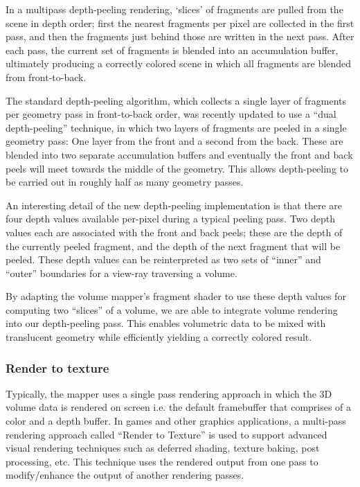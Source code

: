 In a multipass depth-peeling rendering, `slices' of fragments are
pulled from the scene in depth order; first the nearest fragments per
pixel are collected in the first pass, and then the fragments just
behind those are written in the next pass. After each pass, the
current set of fragments is blended into an accumulation buffer,
ultimately producing a correctly colored scene in which all fragments
are blended from front-to-back.

The standard depth-peeling algorithm, which collects a single layer of
fragments per geometry pass in front-to-back order, was recently
updated to use a ``dual depth-peeling''
technique\cite{dualdepthwhitepaper}, in which two layers of fragments
are peeled in a single geometry pass: One layer from the front and a
second from the back. These are blended into two separate accumulation
buffers and eventually the front and back peels will meet towards the
middle of the geometry. This allows depth-peeling to be carried out in
roughly half as many geometry passes.

An interesting detail of the new depth-peeling implementation is that
there are four depth values available per-pixel during a typical
peeling pass. Two depth values each are associated with the front and
back peels; these are the depth of the currently peeled fragment, and
the depth of the next fragment that will be peeled. These depth values
can be reinterpreted as two sets of ``inner'' and ``outer'' boundaries
for a view-ray traversing a volume.

By adapting the volume mapper's fragment shader to use these depth
values for computing two ``slices'' of a volume, we are able to
integrate volume rendering into our depth-peeling pass. This enables
volumetric data to be mixed with translucent geometry while
efficiently yielding a correctly colored result.
 
\subsubsection{Render to texture}
Typically, the mapper uses a single pass rendering approach in which the 3D
volume data is rendered on screen i.e. the default framebuffer that comprises of
a color and a depth buffer. In games and other graphics applications, a
multi-pass rendering approach called ``Render to Texture'' is used to support
advanced visual rendering techniques such as deferred shading, texture baking,
post processing, etc. This technique uses the rendered output from one pass to
modify/enhance the output of another rendering passes. 

